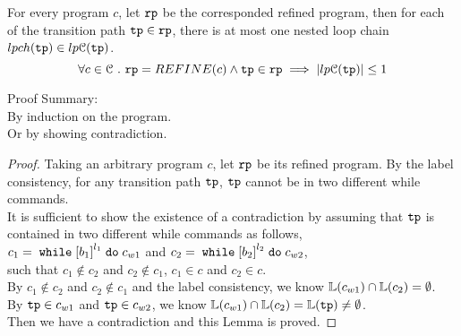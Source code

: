 \begin{lem}
\label{lem:nestloop_unique}
    For every program $c$, let $\mathtt{rp}$ be the corresponded refined program, 
    then for each of the transition path $\mathtt{tp} \in \mathtt{rp}$, there is at most one nested loop chain $lpch(\mathtt{tp}) \in lp\mathcal{C}(\mathtt{tp})$.
    \[
    \forall c \in \mathcal{C} ~.~ \mathtt{rp} = REFINE(c) \land \mathtt{tp} \in \mathtt{rp} \implies 
    |lp\mathcal{C}(\mathtt{tp})| \leq 1
    \]
\end{lem}
Proof Summary:
\\
By induction on the program.
\\
Or by showing contradiction.
\begin{proof}
    Taking an arbitrary program $c$, let $\mathtt{rp}$ be its  refined program.
    By the label consistency, for any transition path $\mathtt{tp}$, $\mathtt{tp}$ cannot be in two different while commands.
    \\
    It is sufficient to show the existence of a contradiction by assuming that 
    $\mathtt{tp}$ is contained in two different while commands as follows,
    \\
    $c_1 = \ewhile \clabel{b_1}^{l_1} \edo c_{w1}$ and $c_2 = \ewhile \clabel{b_2}^{l_2} \edo c_{w2}$, 
    \\
    such that $c_1 \not\in c_2$ and $c_2 \not\in c_1$,
    $c_1 \in c$ and $c_2 \in c$.
    \\
    By $c_1 \not\in c_2$ and $c_2 \not\in c_1$ and the label consistency, we know 
    $\mathbb{L}(c_{w1}) \cap \mathbb{L}(c_2) = \emptyset$.
    \\
    By $\mathtt{tp} \in c_{w1}$ and $\mathtt{tp} \in c_{w2}$, we know 
    $\mathbb{L}(c_{w1}) \cap \mathbb{L}(c_2) = \mathbb{L}(\mathtt{tp}) \neq \emptyset$.
    \\
    Then we have a contradiction and this Lemma is proved.    
\end{proof}